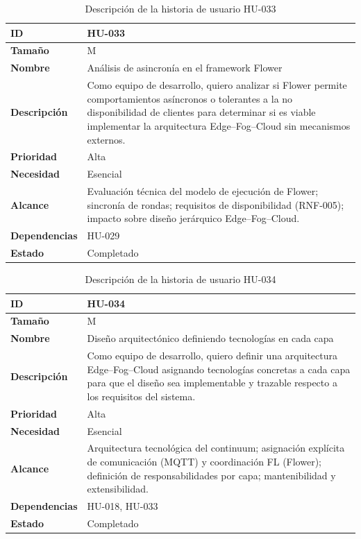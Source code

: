 \documentclass{report}
\begin{document}
\begin{table}[H]
\centering
\caption{Descripción de la historia de usuario HU-033}
\label{tab:hu033}
\begin{tabular}{|l|p{12cm}|}
\hline
\textbf{ID} & HU-033 \\ \hline
\textbf{Tamaño} & M \\ \hline
\textbf{Nombre} & Análisis de asincronía en el framework Flower \\ \hline
\textbf{Descripción} &
Como equipo de desarrollo, quiero analizar si Flower permite comportamientos asíncronos o tolerantes a la no disponibilidad de clientes para determinar si es viable implementar la arquitectura Edge--Fog--Cloud sin mecanismos externos. \\ \hline
\textbf{Prioridad} & Alta \\ \hline
\textbf{Necesidad} & Esencial \\ \hline
\textbf{Alcance} &
Evaluación técnica del modelo de ejecución de Flower; sincronía de rondas; requisitos de disponibilidad (RNF-005); impacto sobre diseño jerárquico Edge--Fog--Cloud. \\ \hline
\textbf{Dependencias} & HU-029 \\ \hline
\textbf{Estado} & Completado \\ \hline
\end{tabular}
\end{table}



\begin{table}[H]
\centering
\caption{Descripción de la historia de usuario HU-034}
\label{tab:hu034}
\begin{tabular}{|l|p{12cm}|}
\hline
\textbf{ID} & HU-034 \\ \hline
\textbf{Tamaño} & M \\ \hline
\textbf{Nombre} & Diseño arquitectónico definiendo tecnologías en cada capa \\ \hline
\textbf{Descripción} &
Como equipo de desarrollo, quiero definir una arquitectura Edge--Fog--Cloud asignando tecnologías concretas a cada capa para que el diseño sea implementable y trazable respecto a los requisitos del sistema. \\ \hline
\textbf{Prioridad} & Alta \\ \hline
\textbf{Necesidad} & Esencial \\ \hline
\textbf{Alcance} &
Arquitectura tecnológica del continuum; asignación explícita de comunicación (MQTT) y coordinación FL (Flower); definición de responsabilidades por capa; mantenibilidad y extensibilidad. \\ \hline
\textbf{Dependencias} & HU-018, HU-033 \\ \hline
\textbf{Estado} & Completado \\ \hline
\end{tabular}
\end{table}
\end{document}
